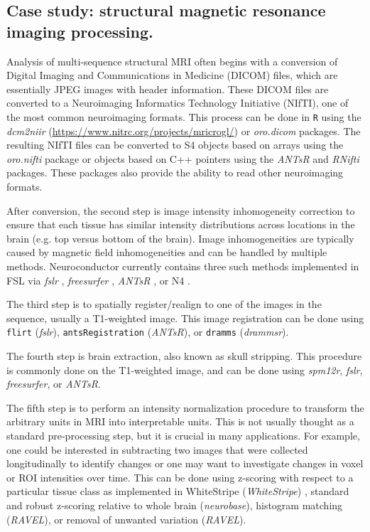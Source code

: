 \documentclass[]{elsarticle} %
\newcommand{\code}[1]{\texttt{#1}}
\newcommand{\pkg}[1]{\emph{#1}}
\begin{document}
\subsection{Case study: structural magnetic resonance imaging processing.} Analysis of multi-sequence structural MRI often begins with a conversion of Digital Imaging and Communications in Medicine (DICOM) files, which are essentially JPEG images with header information.  These DICOM files are converted to a Neuroimaging Informatics Technology Initiative (NIfTI), one of the most common neuroimaging formats. This process can be done in \verb"R" using the \pkg{dcm2niir} (\url{https://www.nitrc.org/projects/mricrogl/}) or \pkg{oro.dicom} \cite{dicom_nifti} packages. The resulting NIfTI files can be converted to S4 objects based on arrays using the \pkg{oro.nifti} \cite{oro.nifti} package or objects based on C++ pointers using the \pkg{ANTsR} \cite{antsr} and \pkg{RNifti} \cite{Rnifti} packages.  These packages also provide the ability to read other neuroimaging formats.

After conversion, the second step is image intensity inhomogeneity correction to ensure that each tissue has similar intensity distributions across locations in the brain (e.g. top versus bottom of the brain). Image inhomogeneities are typically caused by magnetic field inhomogeneities and can be handled by multiple methods. Neuroconductor currently contains three such methods implemented in FSL  via \pkg{fslr} \cite{zhang_segmentation_2001},  \pkg{freesurfer} \cite{sled_nonparametric_1998}, \pkg{ANTsR} \cite{sled_nonparametric_1998}, or N4 \cite{tustison_n4itk:_2010}.  

The third step is to spatially register/realign to one of the images in the sequence, usually a T1-weighted image.  This image registration can be done using \code{flirt} (\pkg{fslr}), \code{antsRegistration} (\pkg{ANTsR}), or \code{dramms} (\pkg{drammsr}).

The fourth step is brain extraction, also known as skull stripping.  This procedure is commonly done on the T1-weighted image, and can be done using \pkg{spm12r}, \pkg{fslr}, \pkg{freesurfer}, or \pkg{ANTsR}.

The fifth step is to perform an intensity normalization procedure to transform the arbitrary units in MRI into interpretable units. This is not usually thought as a standard pre-processing step, but it is crucial in many applications. For example, one could be interested in subtracting two images that were collected longitudinally to identify changes or one may want to investigate changes in voxel or ROI intensities over time.  This can be done using z-scoring with respect to a particular tissue class as implemented in WhiteStripe (\pkg{WhiteStripe}) \citep{whitestripe}, standard and robust z-scoring relative to whole brain (\pkg{neurobase}), histogram matching  (\pkg{RAVEL}), or removal of unwanted variation  (\pkg{RAVEL}).  
\end{document}
